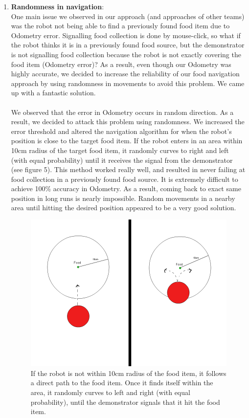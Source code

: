 \documentclass[]{article}
\begin{document}
\begin{enumerate}
 \item \textbf{Randomness in navigation}:\\
  One main issue we observed in our approach (and approaches of other teams) was the robot not being able to find a previously found food item due to Odometry error. Signalling food collection is done by mouse-click, so what if the robot thinks it is in a previously found food source, but the demonstrator is not signalling food collection because the robot is not exactly covering the food item (Odometry error)? As a result, even though our Odometry was highly accurate, we decided to increase the reliability of our food navigation approach by using randomness in movements to avoid this problem. We came up with a fantastic solution.\\\\
  We observed that the error in Odometry occurs in random direction. As a result, we decided to attack this problem using randomness. We increased the error threshold and altered the navigation algorithm for when the robot's position is close to the target food item. If the robot enters in an area within 10cm radius of the target food item, it randomly curves to right and left (with equal probability) until it receives the signal from the demonstrator (see figure 5). This method worked really well, and resulted in never failing at food collection in a previously found food source. It is extremely difficult to achieve 100\% accuracy in Odometry. As a result, coming back to exact same position in long runs is nearly impossible. Random movements in a nearby area until hitting the desired position appeared to be a very good solution. 
 \begin{figure}[h]
 \includegraphics[scale=0.45]{Food_Area}
 \centering
 \caption{If the robot is not within 10cm radius of the food item, it follows a direct path to the food item. Once it finds itself within the area, it randomly curves to left and right (with equal probability), until the demonstrator signals that it hit the food item.}
 \end{figure}
\end{enumerate}
\end{document}
